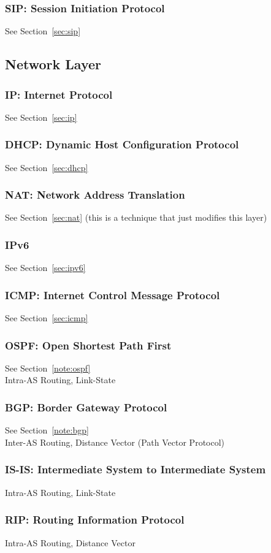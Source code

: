 \subsubsection{SIP: Session Initiation Protocol}
See Section~\ref{sec:sip}

\subsection{Network Layer}
\subsubsection{IP: Internet Protocol}
See Section~\ref{sec:ip}
\subsubsection{DHCP: Dynamic Host Configuration Protocol}
See Section~\ref{sec:dhcp}
\subsubsection{NAT: Network Address Translation}
See Section~\ref{sec:nat} (this is a technique that just modifies this layer)
\subsubsection{IPv6}
See Section~\ref{sec:ipv6}
\subsubsection{ICMP: Internet Control Message Protocol}
See Section~\ref{sec:icmp}
\subsubsection{OSPF: Open Shortest Path First}
See Section~\ref{note:ospf}\\
Intra-AS Routing, Link-State
\subsubsection{BGP: Border Gateway Protocol}
See Section~\ref{note:bgp}\\
Inter-AS Routing, Distance Vector (Path Vector Protocol)
\subsubsection{IS-IS: Intermediate System to Intermediate System}
Intra-AS Routing, Link-State
\subsubsection{RIP: Routing Information Protocol}
Intra-AS Routing, Distance Vector

